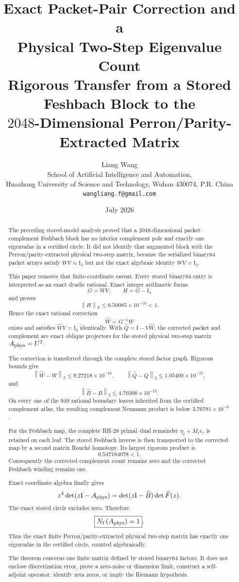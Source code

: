 \documentclass[11pt]{article}
\title{\textbf{Exact Packet-Pair Correction and a\\
Physical Two-Step Eigenvalue Count}\\[0.35em]
\large Rigorous Transfer from a Stored Feshbach Block to the\\
\(2048\)-Dimensional Perron/Parity-Extracted Matrix}
\author{Liang Wang\\
\small School of Artificial Intelligence and Automation,\\[-0.2em]
\small Huazhong University of Science and Technology, Wuhan 430074, P.R. China\\
\small \texttt{wangliang.f@gmail.com}}
\date{July 2026}
\theoremstyle{definition}
\theoremstyle{remark}
\newcommand{\Id}{\mathrm I}
\newcommand{\norm}[1]{\left\lVert#1\right\rVert}
\newcommand{\Aphys}{A_{\rm phys}}
\begin{document}
\maketitle

\begin{abstract}
The preceding stored-model analysis proved that a \(2048\)-dimensional
packet--complement Feshbach block has no interior complement pole and
exactly one eigenvalue in a certified circle.  It did not identify that
augmented block with the Perron/parity-extracted physical two-step matrix,
because the serialized binary64 packet arrays satisfy \(WV\approx\Id_4\)
but not the exact algebraic identity \(WV=\Id_4\).

This paper removes that finite-coordinate caveat.  Every stored binary64
entry is interpreted as an exact dyadic rational.  Exact integer arithmetic
forms
\[
 G=WV,\qquad H=G-\Id_4
\]
and proves
\[
 \norm{H}_F\leq 6.50085\times10^{-16}<1.
\]
Hence the exact rational correction
\[
 \widehat W=G^{-1}W
\]
exists and satisfies \(\widehat WV=\Id_4\) identically.  With
\(\widehat Q=\Id-V\widehat W\), the corrected packet and complement are
exact oblique projectors for the stored physical two-step matrix
\(\Aphys=U^2\).

The correction is transferred through the complete stored factor graph.
Rigorous bounds give
\[
 \norm{\widehat W-W}_2\leq9.27218\times10^{-16},\qquad
 \norm{\widehat Q-Q}_2\leq1.05400\times10^{-15},
\]
and
\[
 \norm{\widehat B-B}_2\leq4.70308\times10^{-15}.
\]
On every one of the \(949\) rational boundary leaves inherited from the
certified complement atlas, the resulting complement Neumann product is
below \(3.76781\times10^{-9}\).

For the Feshbach map, the complete RH-28 primal--dual remainder
\(\eta_\ell+M_\ell c_\ell\) is retained on each leaf.  The stored Feshbach
inverse is then transported to the corrected map by a second matrix
Rouch\'e homotopy.  Its largest rigorous product is
\[
 0.547184078<1.
\]
Consequently the corrected complement count remains zero and the corrected
Feshbach winding remains one.

Exact coordinate algebra finally gives
\[
 z^4\det(z\Id-\Aphys)
 =\det(z\Id-\widehat B)\det\widehat F(z).
\]
The exact stored circle excludes zero.  Therefore
\[
 \boxed{N_\Gamma(\Aphys)=1}.
\]
Thus the exact finite Perron/parity-extracted physical two-step matrix has
exactly one eigenvalue in the certified circle, counted algebraically.

The theorem concerns one finite matrix defined by stored binary64 factors.
It does not enclose discretization error, prove a zero-noise or
dimension limit, construct a self-adjoint operator, identify zeta zeros, or
imply the Riemann hypothesis.
\end{abstract}
\end{document}

